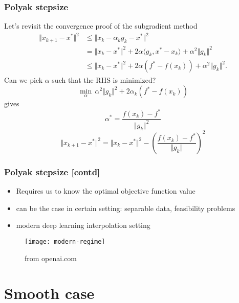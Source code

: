 \documentclass{beamer}
\begin{document}
\begin{frame}
  \frametitle{Polyak stepsize}
  Let's revisit the convergence proof of the subgradient method
  \begin{equation}
    \begin{aligned}
      \Vert x_{k+1} - x^* \Vert^2 &\le \Vert x_k - \alpha_k g_k - x^* \Vert^2 \\
      &= \Vert x_k-x^* \Vert^2 + 2 \alpha \langle g_k, x^*-x_k \rangle + \alpha^2 \Vert g_k \Vert^2\\
      &\le \Vert x_k-x^* \Vert^2 + 2 \alpha (f^* - f(x_k))+ \alpha^2 \Vert g_k \Vert^2.
    \end{aligned}
  \end{equation}
  Can we pick $\alpha$ such that the RHS is minimized?
  \begin{equation}
    \min_\alpha \, \alpha^2 \Vert g_k \Vert^2 + 2 \alpha_k (f^* - f(x_k))
  \end{equation}
  gives
  \begin{equation}
    \alpha^* = \frac{f(x_k)-f^*}{\Vert g_k \Vert^2}
  \end{equation}
  \begin{equation}
      \Vert x_{k+1} - x^* \Vert^2 = \Vert x_k-x^* \Vert^2 - {\left( \frac{f(x_k)-f^*}{\Vert g_k \Vert} \right)}^2
  \end{equation}
\end{frame}

\begin{frame}
  \frametitle{Polyak stepsize [contd]}
  \begin{itemize}
    \item Requires us to know the optimal objective function value
    \item can be the case in certain setting:
          separable data, feasibility problems
    \item modern deep learning interpolation setting
  \end{itemize}
  \begin{figure}[ht]
    \centering
    \texttt{[image: modern-regime]}
    \caption{from openai.com}
  \end{figure}
\end{frame}


\section{Smooth case}%
\label{sec:}
\end{document}
